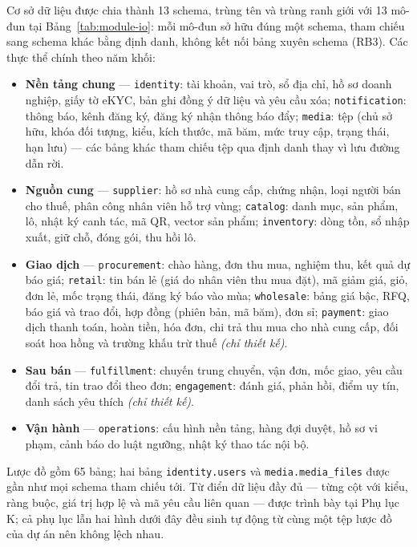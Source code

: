 Cơ sở dữ liệu được chia thành 13 schema, trùng tên và trùng ranh giới với 13 mô-đun tại Bảng~\ref{tab:module-io}: mỗi mô-đun sở hữu đúng một schema, tham chiếu sang schema khác bằng định danh, không kết nối bảng xuyên schema (RB3). Các thực thể chính theo năm khối:
\begin{itemize}
    \item \textbf{Nền tảng chung} --- \texttt{identity}: tài khoản, vai trò, sổ địa chỉ, hồ sơ doanh nghiệp, giấy tờ eKYC, bản ghi đồng ý dữ liệu và yêu cầu xóa; \texttt{notification}: thông báo, kênh đăng ký, đăng ký nhận thông báo đẩy; \texttt{media}: tệp (chủ sở hữu, khóa đối tượng, kiểu, kích thước, mã băm, mức truy cập, trạng thái, hạn lưu) --- các bảng khác tham chiếu tệp qua định danh thay vì lưu đường dẫn rời.
    \item \textbf{Nguồn cung} --- \texttt{supplier}: hồ sơ nhà cung cấp, chứng nhận, loại người bán cho thuế, phân công nhân viên hỗ trợ vùng; \texttt{catalog}: danh mục, sản phẩm, lô, nhật ký canh tác, mã QR, vector sản phẩm; \texttt{inventory}: dòng tồn, sổ nhập xuất, giữ chỗ, đóng gói, thu hồi lô.
    \item \textbf{Giao dịch} --- \texttt{procurement}: chào hàng, đơn thu mua, nghiệm thu, kết quả dự báo giá; \texttt{retail}: tin bán lẻ (giá do nhân viên thu mua đặt), mã giảm giá, giỏ, đơn lẻ, mốc trạng thái, đăng ký báo vào mùa; \texttt{wholesale}: bảng giá bậc, RFQ, báo giá và trao đổi, hợp đồng (phiên bản, mã băm), đơn sỉ; \texttt{payment}: giao dịch thanh toán, hoàn tiền, hóa đơn, chi trả thu mua cho nhà cung cấp, đối soát hoa hồng và trường khấu trừ thuế \emph{(chỉ thiết kế)}.
    \item \textbf{Sau bán} --- \texttt{fulfillment}: chuyến trung chuyển, vận đơn, mốc giao, yêu cầu đổi trả, tin trao đổi theo đơn; \texttt{engagement}: đánh giá, phản hồi, điểm uy tín, danh sách yêu thích \emph{(chỉ thiết kế)}.
    \item \textbf{Vận hành} --- \texttt{operations}: cấu hình nền tảng, hàng đợi duyệt, hồ sơ vi phạm, cảnh báo do luật ngưỡng, nhật ký thao tác nội bộ.
\end{itemize}

Lược đồ gồm 65 bảng; hai bảng \texttt{identity.users} và \texttt{media.media\_files} được gần như mọi schema tham chiếu tới. Từ điển dữ liệu đầy đủ --- từng cột với kiểu, ràng buộc, giá trị hợp lệ và mã yêu cầu liên quan --- được trình bày tại Phụ lục K; cả phụ lục lẫn hai hình dưới đây đều sinh tự động từ cùng một tệp lược đồ của dự án nên không lệch nhau.

